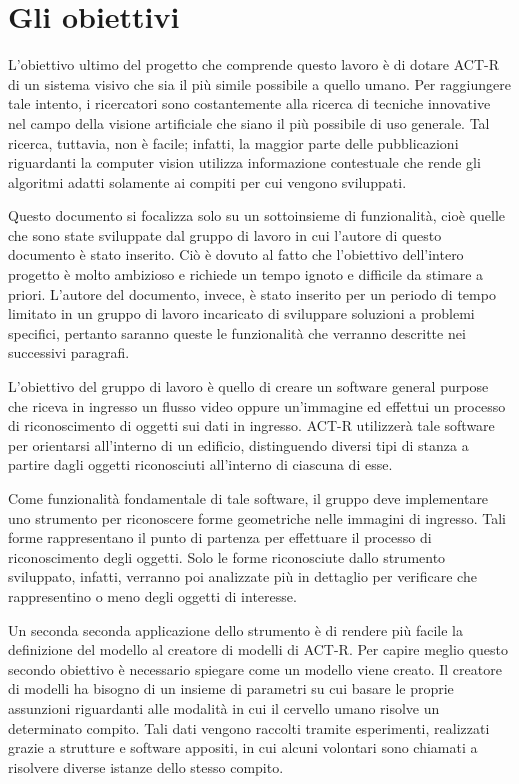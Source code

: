 	\section*{Gli obiettivi}\label{obiettivi}
		L'obiettivo ultimo del progetto che comprende questo lavoro è di dotare \mbox{ACT-R} di un sistema visivo che sia il più simile possibile a quello umano.
		Per raggiungere tale intento, i ricercatori sono costantemente alla ricerca di tecniche innovative nel campo della visione artificiale che siano il più possibile di uso generale.
		Tal ricerca, tuttavia, non è facile; infatti, la maggior parte delle pubblicazioni riguardanti la computer vision utilizza informazione contestuale che rende gli algoritmi adatti solamente ai compiti per cui vengono sviluppati.
		
		Questo documento si focalizza solo su un sottoinsieme di funzionalità, cioè quelle che sono state sviluppate dal gruppo di lavoro in cui l'autore di questo documento è stato inserito.	
		Ciò è dovuto al fatto che l'obiettivo dell'intero progetto è molto ambizioso e richiede un tempo ignoto e difficile da stimare a priori. 
		L'autore del documento, invece, è stato inserito per un periodo di tempo limitato in un gruppo di lavoro incaricato di sviluppare soluzioni a problemi specifici, pertanto saranno queste le funzionalità che verranno descritte nei successivi paragrafi.

		L'obiettivo del gruppo di lavoro è quello di creare un software general purpose che riceva in ingresso un flusso video oppure un'immagine ed effettui un processo di riconoscimento di oggetti sui dati in ingresso.
		\mbox{ACT-R} utilizzerà tale software per orientarsi all'interno di un edificio, distinguendo diversi tipi di stanza a partire dagli oggetti riconosciuti all'interno di ciascuna di esse.

		Come funzionalità fondamentale di tale software, il gruppo deve implementare uno strumento per riconoscere forme geometriche nelle immagini di ingresso. 
		Tali forme rappresentano il punto di partenza per effettuare il processo di riconoscimento degli oggetti. 
		Solo le forme riconosciute dallo strumento sviluppato, infatti, verranno poi analizzate più in dettaglio per verificare che rappresentino o meno degli oggetti di interesse.

		Un seconda seconda applicazione dello strumento è di rendere più facile la definizione del modello al creatore di modelli di \mbox{ACT-R}.
		Per capire meglio questo secondo obiettivo è necessario spiegare come un modello viene creato.
		Il creatore di modelli ha bisogno di un insieme di parametri su cui basare le proprie assunzioni riguardanti alle modalità in cui il cervello umano risolve un determinato compito.
		Tali dati vengono raccolti tramite esperimenti, realizzati grazie a strutture e software appositi, in cui alcuni volontari sono chiamati a risolvere diverse istanze dello stesso compito.
		
